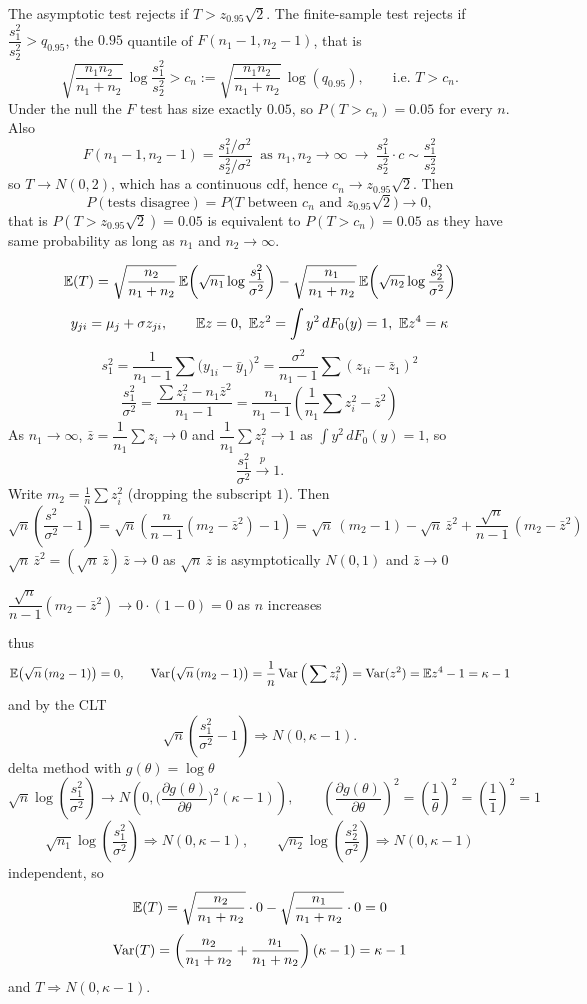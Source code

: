 \documentclass[11pt]{article}
\begin{document}
The asymptotic test rejects if $T>z_{0.95}\sqrt2$. The finite-sample test rejects if $\dfrac{s_1^2}{s_2^2}>q_{0.95}$, the $0.95$ quantile of $F(n_1-1,n_2-1)$, that is
\[
\sqrt{\frac{n_1n_2}{n_1+n_2}}\,\log\frac{s_1^2}{s_2^2}>c_n:=\sqrt{\frac{n_1n_2}{n_1+n_2}}\,\log(q_{0.95}),\qquad\text{i.e. } T>c_n .
\]
Under the null the $F$ test has size exactly $0.05$, so $P(T>c_n)=0.05$ for every $n$. Also
\[
F(n_1-1,n_2-1)=\frac{s_1^2/\sigma^2}{s_2^2/\sigma^2}\ \text{ as } n_1,n_2\to\infty\ \to\ \frac{s_1^2}{s_2^2}\cdot c\sim\frac{s_1^2}{s_2^2}
\]
so $T\to N(0,2)$, which has a continuous cdf, hence $c_n\to z_{0.95}\sqrt2$. Then
\[
P(\text{tests disagree})=P\big(T\text{ between }c_n\text{ and }z_{0.95}\sqrt2\big)\to0 ,
\]
that is $P(T>z_{0.95}\sqrt2)=0.05$ is equivalent to $P(T>c_n)=0.05$ as they have same probability as long as $n_1$ and $n_2\to\infty$.

\[
\mathbb{E}(T)=\sqrt{\frac{n_2}{n_1+n_2}}\,\mathbb{E}\!\left(\sqrt{n_1}\log\frac{s_1^2}{\sigma^2}\right)-\sqrt{\frac{n_1}{n_1+n_2}}\,\mathbb{E}\!\left(\sqrt{n_2}\log\frac{s_2^2}{\sigma^2}\right)
\]
\[
y_{ji}=\mu_j+\sigma z_{ji},\qquad \E z=0,\ \E z^2=\int y^2\,dF_0(y)=1,\ \E z^4=\kappa
\]
\[
s_1^2=\frac1{n_1-1}\sum\big(y_{1i}-\bar y_1\big)^2=\frac{\sigma^2}{n_1-1}\sum(z_{1i}-\bar z_1)^2
\]
\[
\frac{s_1^2}{\sigma^2}=\frac{\sum z_{i}^2-n_1\bar z^2}{n_1-1}=\frac{n_1}{n_1-1}\left(\frac1{n_1}\sum z_i^2-\bar z^2\right)
\]
As $n_1\to\infty$, $\bar z=\dfrac1{n_1}\sum z_i\to0$ and $\dfrac1{n_1}\sum z_i^2\to1$ as $\int y^2\,dF_0(y)=1$, so
\[
\frac{s_1^2}{\sigma^2}\xrightarrow{p}1 .
\]
Write $m_2=\frac1n\sum z_i^2$ (dropping the subscript $1$). Then
\[
\sqrt n\left(\frac{s^2}{\sigma^2}-1\right)=\sqrt n\left(\frac{n}{n-1}(m_2-\bar z^2)-1\right)
=\sqrt n\,(m_2-1)-\sqrt n\,\bar z^2+\frac{\sqrt n}{n-1}\,(m_2-\bar z^2)
\]
$\sqrt n\,\bar z^2=(\sqrt n\,\bar z)\,\bar z\to0$ as $\sqrt n\,\bar z$ is asymptotically $N(0,1)$ and $\bar z\to0$

$\dfrac{\sqrt n}{n-1}(m_2-\bar z^2)\to0\cdot(1-0)=0$ as $n$ increases

thus
\[
\mathbb{E}\!\left(\sqrt n\,(m_2-1)\right)=0,\qquad
\operatorname{Var}\!\left(\sqrt n\,(m_2-1)\right)=\frac1n\operatorname{Var}\Big(\sum z_i^2\Big)=\operatorname{Var}(z^2)=\mathbb{E} z^4-1=\kappa-1
\]
and by the CLT
\[
\sqrt n\left(\frac{s_1^2}{\sigma^2}-1\right)\Rightarrow N(0,\kappa-1).
\]
delta method with $g(\theta)=\log\theta$
\[
\sqrt n\log\!\left(\frac{s_1^2}{\sigma^2}\right)\to N\!\left(0,\Big(\frac{\partial g(\theta)}{\partial\theta}\Big)^{2}(\kappa-1)\right),\qquad
\left(\frac{\partial g(\theta)}{\partial\theta}\right)^2=\left(\frac1\theta\right)^2=\left(\frac11\right)^2=1
\]
\[
\sqrt{n_1}\log\!\left(\frac{s_1^2}{\sigma^2}\right)\Rightarrow N(0,\kappa-1),\qquad
\sqrt{n_2}\log\!\left(\frac{s_2^2}{\sigma^2}\right)\Rightarrow N(0,\kappa-1)
\]
independent, so
\[
\mathbb{E}(T)=\sqrt{\frac{n_2}{n_1+n_2}}\cdot0-\sqrt{\frac{n_1}{n_1+n_2}}\cdot0=0
\]
\[
\operatorname{Var}(T)=\left(\frac{n_2}{n_1+n_2}+\frac{n_1}{n_1+n_2}\right)(\kappa-1)=\kappa-1
\]
and $T\Rightarrow N(0,\kappa-1)$.
\end{document}
